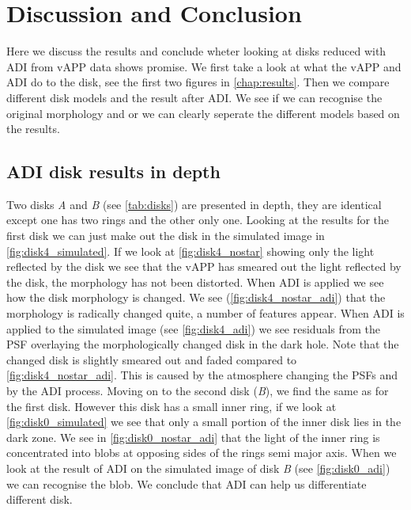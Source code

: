 \chapter{Discussion and Conclusion}

Here we discuss the results and conclude wheter looking at disks reduced with \ac{ADI} from \ac{vAPP} data shows promise. We first take a look at what the \ac{vAPP} and \ac{ADI} do to the disk, see the first two figures in \autoref{chap:results}. Then we compare different disk models and the result after \ac{ADI}. We see if we can recognise the original morphology and or we can clearly seperate the different models based on the results. 

\section{ADI disk results in depth}
Two disks \textit{A} and \textit{B} (see \autoref{tab:disks}) are presented in depth, they are identical except one has two rings and the other only one. Looking at the results for the first disk we can just make out the disk in the simulated image in \autoref{fig:disk4_simulated}. If we look at \autoref{fig:disk4_nostar} showing only the light reflected by the disk we see that the \ac{vAPP} has smeared out the light reflected by the disk, the morphology has not been distorted. When \ac{ADI} is applied we see how the disk morphology is changed. We see (\autoref{fig:disk4_nostar_adi}) that the morphology is radically changed quite, a number of features appear. When \ac{ADI} is applied to the simulated image (see \autoref{fig:disk4_adi}) we see residuals from the \ac{PSF} overlaying the morphologically changed disk in the dark hole. Note that the changed disk is slightly smeared out and faded compared to \autoref{fig:disk4_nostar_adi}. This is caused by the atmosphere changing the \acp{PSF} and by the \ac{ADI} process.
    Moving on to the second disk (\textit{B}), we find the same as for the first disk. However this disk has a small inner ring, if we look at \autoref{fig:disk0_simulated} we see that only a small portion of the inner disk lies in the dark zone. We see in \autoref{fig:disk0_nostar_adi} that the light of the inner ring is concentrated into blobs at opposing sides of the rings semi major axis. When we look at the result of \ac{ADI} on the simulated image of disk \textit{B} (see \autoref{fig:disk0_adi}) we can recognise the blob. 
    We conclude that \ac{ADI} can help us differentiate different disk. 

